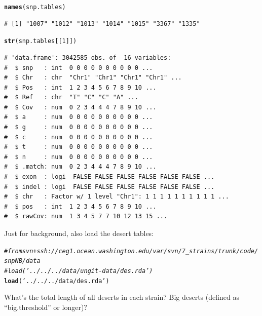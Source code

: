 \documentclass{article}\usepackage[]{graphicx}\usepackage[]{color}
\makeatletter
\newcommand{\hlnum}[1]{\textcolor[rgb]{0.686,0.059,0.569}{#1}}%
\newcommand{\hlstr}[1]{\textcolor[rgb]{0.192,0.494,0.8}{#1}}%
\newcommand{\hlcom}[1]{\textcolor[rgb]{0.678,0.584,0.686}{\textit{#1}}}%
\newcommand{\hlstd}[1]{\textcolor[rgb]{0.345,0.345,0.345}{#1}}%
\newcommand{\hlkwd}[1]{\textcolor[rgb]{0.737,0.353,0.396}{\textbf{#1}}}%
\newenvironment{kframe}{%
 \def\at@end@of@kframe{}%
 \ifinner\ifhmode%
  \def\at@end@of@kframe{\end{minipage}}%
  \begin{minipage}{\columnwidth}%
 \fi\fi%
 \def\FrameCommand##1{\hskip\@totalleftmargin \hskip-\fboxsep
 \colorbox{shadecolor}{##1}\hskip-\fboxsep
     \hskip-\linewidth \hskip-\@totalleftmargin \hskip\columnwidth}%
 \MakeFramed {\advance\hsize-\width
   \@totalleftmargin\z@ \linewidth\hsize
   \@setminipage}}%
 {\par\unskip\endMakeFramed%
 \at@end@of@kframe}
\newenvironment{knitrout}{}{} %
\makeatother
\begin{document}
\begin{knitrout}\footnotesize
{}\color{fgcolor}\begin{kframe}
\begin{alltt}
\hlkwd{names}\hlstd{(snp.tables)}
\end{alltt}
\begin{verbatim}
# [1] "1007" "1012" "1013" "1014" "1015" "3367" "1335"
\end{verbatim}
\begin{alltt}
\hlkwd{str}\hlstd{(snp.tables[[}\hlnum{1}\hlstd{]])}
\end{alltt}
\begin{verbatim}
# 'data.frame':	3042585 obs. of  16 variables:
#  $ snp   : int  0 0 0 0 0 0 0 0 0 0 ...
#  $ Chr   : chr  "Chr1" "Chr1" "Chr1" "Chr1" ...
#  $ Pos   : int  1 2 3 4 5 6 7 8 9 10 ...
#  $ Ref   : chr  "T" "C" "C" "A" ...
#  $ Cov   : num  0 2 3 4 4 4 7 8 9 10 ...
#  $ a     : num  0 0 0 0 0 0 0 0 0 0 ...
#  $ g     : num  0 0 0 0 0 0 0 0 0 0 ...
#  $ c     : num  0 0 0 0 0 0 0 0 0 0 ...
#  $ t     : num  0 0 0 0 0 0 0 0 0 0 ...
#  $ n     : num  0 0 0 0 0 0 0 0 0 0 ...
#  $ .match: num  0 2 3 4 4 4 7 8 9 10 ...
#  $ exon  : logi  FALSE FALSE FALSE FALSE FALSE FALSE ...
#  $ indel : logi  FALSE FALSE FALSE FALSE FALSE FALSE ...
#  $ chr   : Factor w/ 1 level "Chr1": 1 1 1 1 1 1 1 1 1 1 ...
#  $ pos   : int  1 2 3 4 5 6 7 8 9 10 ...
#  $ rawCov: num  1 3 4 5 7 7 10 12 13 15 ...
\end{verbatim}
\end{kframe}
\end{knitrout}

Just for background, also load the desert tables:

\begin{knitrout}\footnotesize
{}\color{fgcolor}\begin{kframe}
\begin{alltt}
\hlcom{# from svn+ssh://ceg1.ocean.washington.edu/var/svn/7_strains/trunk/code/snpNB/data}
\hlcom{#load('../../../data/ungit-data/des.rda')}
\hlkwd{load}\hlstd{(}\hlstr{'../../../data/des.rda'}\hlstd{)}
\end{alltt}
\end{kframe}
\end{knitrout}

What's the total length of all deserts in each strain?  Big deserts (defined as ``big.threshold'' or longer)?
\end{document}
